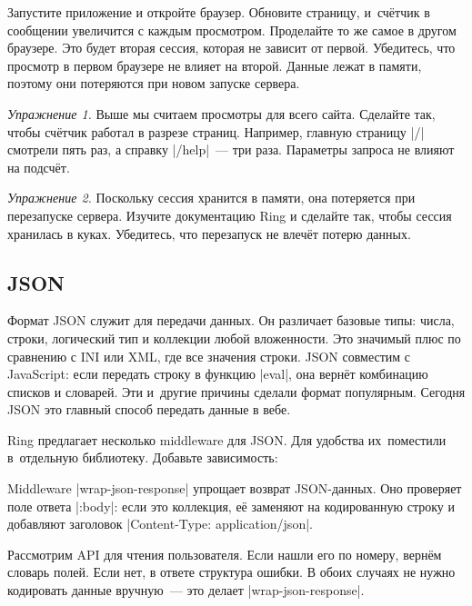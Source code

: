 Запустите приложение и откройте браузер. Обновите страницу, и~сч\"{е}тчик в
сообщении увеличится с каждым просмотром. Проделайте то же самое в другом
браузере. Это будет вторая сессия, которая не зависит от первой. Убедитесь, что
просмотр в первом браузере не влияет на второй. Данные лежат в памяти, поэтому
они потеряются при новом запуске сервера.

\emph{Упражнение 1.} Выше мы считаем просмотры для всего сайта. Сделайте так,
чтобы сч\"{е}тчик работал в разрезе страниц. Например, главную страницу \spverb|/|
смотрели пять раз, а справку \spverb|/help|~--- три раза. Параметры запроса не
влияют на подсч\"{е}т.

\emph{Упражнение 2.} Поскольку сессия хранится в памяти, она потеряется при
перезапуске сервера. Изучите документацию Ring и сделайте так, чтобы сессия
хранилась в куках. Убедитесь, что перезапуск не влеч\"{е}т потерю данных.

\subsection{JSON}


Формат JSON служит для передачи данных. Он различает базовые типы: числа,
строки, логический тип и коллекции любой вложенности. Это значимый плюс по
сравнению с INI или XML, где все значения строки. JSON совместим с JavaScript:
если передать строку в функцию \spverb|eval|, она верн\"{е}т комбинацию списков
и словарей. Эти и~другие причины сделали формат популярным. Сегодня JSON это
главный способ передать данные в вебе.

Ring предлагает несколько middleware для JSON. Для удобства их~поместили
в~отдельную библиотеку. Добавьте зависимость:

\begin{english}
  \begin{clojure}
  \end{clojure}
\end{english}


Middleware \spverb|wrap-json-response| упрощает возврат JSON-данных. Оно
проверяет поле ответа \spverb|:body|: если это коллекция, е\"{е} заменяют на
кодированную строку и добавляют заголовок \spverb|Content-Type:
application/json|.

Рассмотрим API для чтения пользователя. Если нашли его по номеру, верн\"{е}м
словарь полей. Если нет, в ответе структура ошибки. В обоих случаях не нужно
кодировать данные вручную~--- это делает \spverb|wrap-json-response|.

